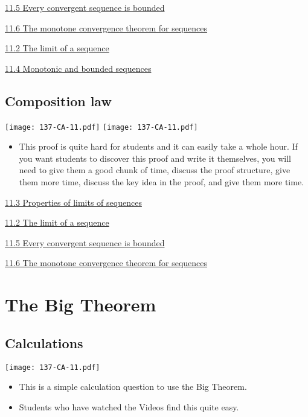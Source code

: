 \documentclass[11pt]{article}
\newcommand{\nl}{\hfill \vspace{-1.1\baselineskip}} %
\newcommand{\vii}{\hspace{8mm} \href{https://www.youtube.com/watch?v=Dr8LzBA-H84&list=PLlwePzQY_wW_yFyXauToZNFNhhufzioP2&index=2}{11.2 The limit of a sequence}}
\newcommand{\viii}{\hspace{8mm} \href{https://www.youtube.com/watch?v=xuNRMkzSzZY&list=PLlwePzQY_wW_yFyXauToZNFNhhufzioP2&index=3}{11.3 Properties of limits of sequences}}
\newcommand{\viv}{\hspace{8mm} \href{https://www.youtube.com/watch?v=J8uZJ9by0ys&list=PLlwePzQY_wW_yFyXauToZNFNhhufzioP2&index=4}{11.4 Monotonic and bounded sequences}}
\newcommand{\vv}{\hspace{8mm} \href{https://www.youtube.com/watch?v=njHTdc0rv6Y&list=PLlwePzQY_wW_yFyXauToZNFNhhufzioP2&index=5}{11.5 Every convergent sequence is bounded}}
\newcommand{\vvi}{\hspace{8mm} \href{https://www.youtube.com/watch?v=5m7XdA7ogEk&list=PLlwePzQY_wW_yFyXauToZNFNhhufzioP2&index=6}{11.6 The monotone convergence theorem for sequences}}
\begin{document}
\begin{videos}
\vv

\vvi

\vii

\viv
\end{videos}

\newpage
\subsection{Composition law}

\begin{center}
{ \texttt{[image: 137-CA-11.pdf]}} \quad
{ \texttt{[image: 137-CA-11.pdf]}} 
\end{center}

\begin{comments}
\nl
	\begin{itemize}
		\item  This proof is quite hard for students and it can easily take a whole hour.  If you want students to discover this proof and write it themselves, you will need to give them a good chunk of time, discuss the proof structure, give them more time, discuss the key idea in the proof, and give them more time.  	\end{itemize}
\end{comments}

\begin{videos}
\viii

\vii

\vv

\vvi
\end{videos}

\newpage
\section{The Big Theorem}
\subsection{Calculations}

\begin{center}
{ \texttt{[image: 137-CA-11.pdf]}} 
\end{center}

\begin{comments}
\nl
	\begin{itemize}
		\item  This is a simple calculation question to use the Big Theorem.
		\item Students who have watched the Videos find this quite easy.
	\end{itemize}
\end{comments}
\end{document}

